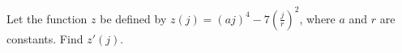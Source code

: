 Let the function $z$ be defined by $z(j)=(aj)^4-7\left(\frac{j}{r}\right)^2$,
where $a$ and $r$ are constants. Find $z'(j)$.\answercheck
